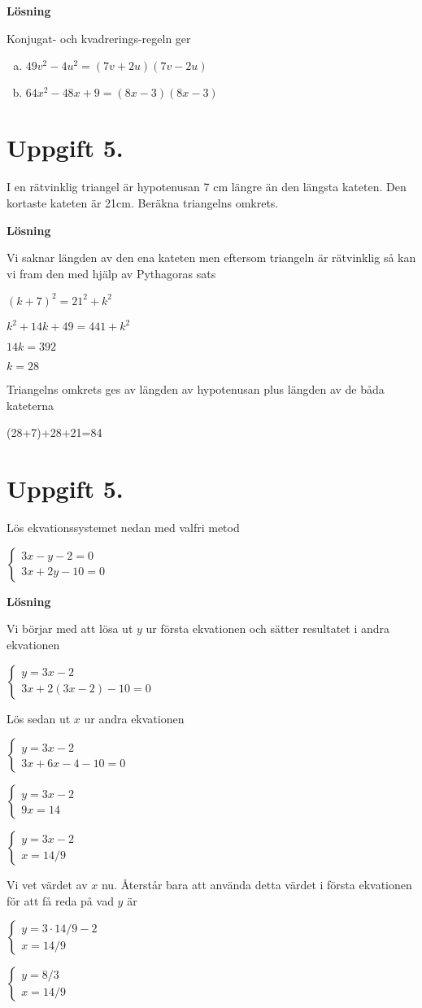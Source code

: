 \documentclass{article}
\begin{document}
\textbf{Lösning}

Konjugat- och kvadrerings-regeln ger
\begin{enumerate}[(a)]
\item $49v^2-4u^2=(7v+2u)(7v-2u)$
\item $64x^2-48x+9=(8x-3)(8x-3)$
\end{enumerate}

\section*{Uppgift 5.}
I en rätvinklig triangel är hypotenusan 7 cm längre än den längsta kateten. Den kortaste kateten är 21cm. Beräkna triangelns omkrets.

\textbf{Lösning}

Vi saknar längden av den ena kateten men eftersom triangeln är rätvinklig så kan vi fram den med hjälp av Pythagoras sats

$(k+7)^2=21^2+k^2$

$k^2+14k+49=441+k^2$

$14k=392$

$k=28$

Triangelns omkrets ges av längden av hypotenusan plus längden av de båda kateterna

(28+7)+28+21=84
\section*{Uppgift 5.}
Lös ekvationssystemet nedan med valfri metod

$\begin{cases}
3x-y-2=0\\
3x+2y-10=0
\end{cases}$

\textbf{Lösning}

Vi börjar med att lösa ut $y$ ur första ekvationen och sätter resultatet i andra ekvationen

$\begin{cases}
y=3x-2\\
3x+2(3x-2)-10=0
\end{cases}$

Lös sedan ut $x$ ur andra ekvationen

$\begin{cases}
y=3x-2\\
3x+6x-4-10=0
\end{cases}$

$\begin{cases}
y=3x-2\\
9x=14
\end{cases}$

$\begin{cases}
y=3x-2\\
x=14/9
\end{cases}$

Vi vet värdet av $x$ nu. Återstår bara att använda detta värdet i första ekvationen för att få reda på vad $y$ är

$\begin{cases}
y=3\cdot14/9-2\\
x=14/9
\end{cases}$

$\begin{cases}
y=8/3\\
x=14/9
\end{cases}$
\end{document}
